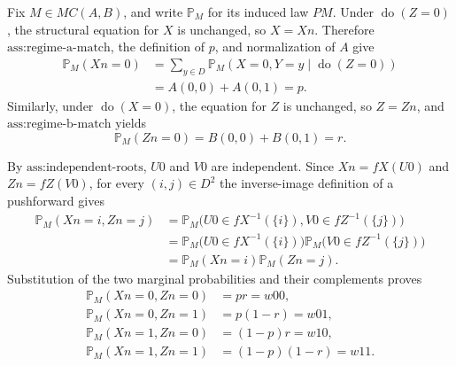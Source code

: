 Fix \(M\in MC(A,B)\), and write \(\mathbb P_M\) for its induced law \(PM\).  Under \(\operatorname{do}(Z=0)\), the structural equation for \(X\) is unchanged, so \(X=Xn\).  Therefore \(\text{ass:regime-a-match}\), the definition of \(p\), and normalization of \(A\) give
\[
\begin{aligned}
\mathbb P_M(Xn=0)
&=\sum_{y\in D}\mathbb P_M(X=0,Y=y\mid\operatorname{do}(Z=0))\\
&=A(0,0)+A(0,1)=p.
\end{aligned}
\]
Similarly, under \(\operatorname{do}(X=0)\), the equation for \(Z\) is unchanged, so \(Z=Zn\), and \(\text{ass:regime-b-match}\) yields
\[
\mathbb P_M(Zn=0)=B(0,0)+B(0,1)=r.
\]

By \(\text{ass:independent-roots}\), \(U0\) and \(V0\) are independent.  Since \(Xn=fX(U0)\) and \(Zn=fZ(V0)\), for every \((i,j)\in D^2\) the inverse-image definition of a pushforward gives
\[
\begin{aligned}
\mathbb P_M(Xn=i,Zn=j)
&=\mathbb P_M\bigl(U0\in fX^{-1}(\{i\}),V0\in fZ^{-1}(\{j\})\bigr)\\
&=\mathbb P_M\bigl(U0\in fX^{-1}(\{i\})\bigr)
  \mathbb P_M\bigl(V0\in fZ^{-1}(\{j\})\bigr)\\
&=\mathbb P_M(Xn=i)\mathbb P_M(Zn=j).
\end{aligned}
\]
Substitution of the two marginal probabilities and their complements proves
\[
\begin{aligned}
\mathbb P_M(Xn=0,Zn=0)&=pr=w00,\\
\mathbb P_M(Xn=0,Zn=1)&=p(1-r)=w01,\\
\mathbb P_M(Xn=1,Zn=0)&=(1-p)r=w10,\\
\mathbb P_M(Xn=1,Zn=1)&=(1-p)(1-r)=w11.
\end{aligned}
\]

